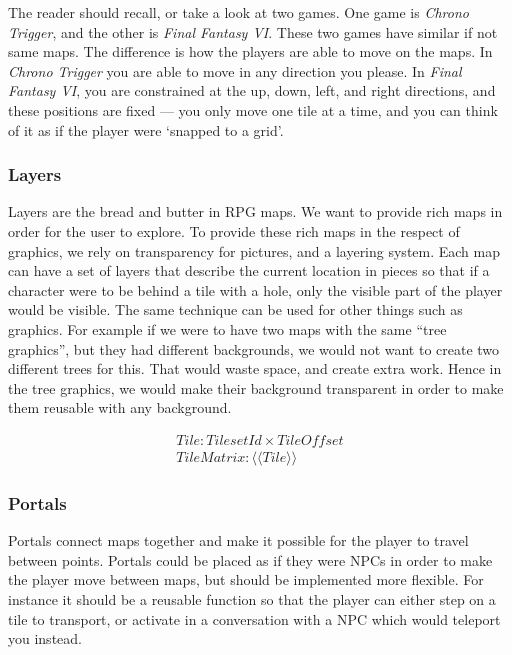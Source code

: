 The reader should recall, or take a look at two games. One game is
\textit{Chrono Trigger}, and the other is \textit{Final Fantasy VI}. These two
games have similar if not same maps. The difference is how the players are able
to move on the maps. In \textit{Chrono Trigger} you are able to move in any
direction you please. In \textit{Final Fantasy VI}, you are constrained at the
up, down, left, and right directions, and these positions are fixed --- you only
move one tile at a time, and you can think of it as if the player were `snapped
to a grid'.

\subsubsection{Layers}

Layers are the bread and butter in RPG maps. We want to provide rich maps in
order for the user to explore. To provide these rich maps in the respect of
graphics, we rely on transparency for pictures, and a layering system. Each
map can have a set of layers that describe the current location in pieces so
that if a character were to be behind a tile with a hole, only the visible part
of the player would be visible. The same technique can be used for other things
such as graphics. For example if we were to have two maps with the same ``tree
graphics'', but they had different backgrounds, we would not want to create two
different trees for this. That would waste space, and create extra work. Hence
in the tree graphics, we would make their background transparent in order to
make them reusable with any background.

\begin{equation}
\begin{split}
Tile\colon TilesetId \times TileOffset \\
TileMatrix\colon \langle \langle Tile \rangle \rangle
\end{split}
\end{equation}

\subsubsection{Portals}

Portals connect maps together and make it possible for the player to travel
between points. Portals could be placed as if they were NPCs in order to make
the player move between maps, but should be implemented more flexible. For
instance it should be a reusable function so that the player can either step
on a tile to transport, or activate in a conversation with a NPC which would
teleport you instead.

